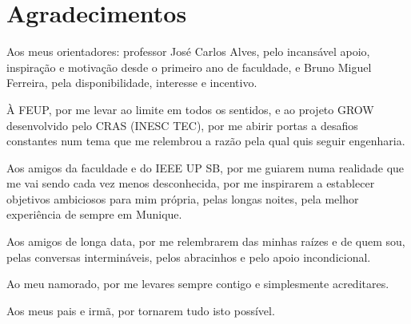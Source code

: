 \chapter*{Agradecimentos}
\noindent
Aos meus orientadores: professor José Carlos Alves, pelo incansável apoio, inspiração e motivação desde o primeiro ano de faculdade, e Bruno Miguel Ferreira, pela disponibilidade, interesse e incentivo.

\noindent
À FEUP, por me levar ao limite em todos os sentidos, e ao projeto GROW desenvolvido pelo CRAS (INESC TEC), por me abirir portas a desafios constantes num tema que me relembrou a razão pela qual quis seguir engenharia.

\noindent
Aos amigos da faculdade e do IEEE UP SB, por me guiarem numa realidade que me vai sendo cada vez menos desconhecida, por me inspirarem a establecer objetivos ambiciosos para mim própria, pelas longas noites, pela melhor experiência de sempre em Munique.

\noindent
Aos amigos de longa data, por me relembrarem das minhas raízes e de quem sou, pelas conversas intermináveis, pelos abracinhos e pelo apoio incondicional.

\noindent
Ao meu namorado, por me levares sempre contigo e simplesmente acreditares.

\noindent
Aos meus pais e irmã, por tornarem tudo isto possível.

\vspace{10mm}
